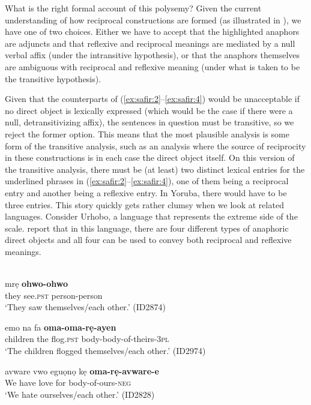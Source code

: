 \documentclass[output=paper]{langsci/langscibook}
\begin{document}
What is the right formal account of this polysemy? Given the current understanding of how reciprocal constructions are formed (as illustrated in ), we have one of two choices. Either we have to accept that the highlighted anaphors are adjuncts and that reflexive and reciprocal meanings are mediated by a null verbal affix (under the intransitive hypothesis), or that the anaphors themselves are ambiguous with reciprocal and reflexive meaning (under what is taken to be the transitive hypothesis). 

Given that the counterparts of (\ref{ex:safir:2}--\ref{ex:safir:4}) would be unacceptable if no direct object is lexically expressed (which would be the case if there were a null, detransitivizing affix), the sentences in question must be transitive, so we reject the former option. This means that the most plausible analysis is some form of the transitive analysis, such as an analysis where the source of reciprocity in these constructions is in each case the direct object itself. On this version of the transitive analysis, there must be (at least) two distinct lexical entries for the underlined phrases in (\ref{ex:safir:2}--\ref{ex:safir:4}), one of them being a reciprocal entry and another being a reflexive entry. In Yoruba, there would have to be three entries. This story quickly gets rather clumsy when we look at related languages. Consider Urhobo, a language that represents the extreme side of the scale. \citet{AzizaSafir2006} report that in this language, there are four different types of anaphoric direct objects and all four can be used to convey both reciprocal and reflexive meanings. 


\ea\label{ex:safir:5}
 \\
  \ea\label{ex:safir:5a}
     {mrẹ}     \textbf{{ohwo-ohwo}} \\
	they   see.\textsc{pst}   person-person \\
  \glt   ‘They saw themselves/each other.’ (ID2874)

  \ex\label{ex:safir:5b}
  \gll emo    na  fa    \textbf{{oma-oma-rẹ-ayen}}\\
  children  the  flog.\textsc{pst}  body-body-of-theirs-\textsc{3pl}\\
  \glt   ‘The children flogged themselves/each other.’ (ID2974)

  \ex\label{ex:safir:5c}
  \gll avware   vwo  eguọnọ   kẹ   \textbf{oma-rẹ-avware-e}\\
	We     have   love     for   body-of-ours-\textsc{neg}  \\
  \glt   ‘We hate ourselves/each other.’  (ID2828)
\end{document}
